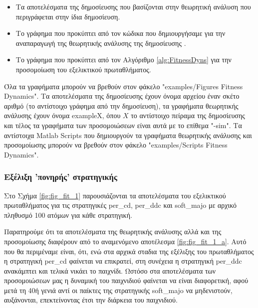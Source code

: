 \documentclass[12pt]{report}
\begin{document}
\begin{itemize}
    \item Τα αποτελέσματα της δημοσίευσης \cite{mathieu1999} που βασίζονται στην θεωρητική ανάλυση που περιγράφεται στην ίδια δημοσίευση.
    \item Το γράφημα που προκύπτει από τον κώδικα που δημιουργήσαμε για την αναπαραγωγή της θεωρητικής ανάλυσης της δημοσίευσης \cite{mathieu1999}.
    \item Το γράφημα που προκύπτει από τον Αλγόριθμο \ref{alg:FitnessDyns} για την προσομοίωση του εξελικτικού πρωταθλήματος.
\end{itemize}
Όλα τα γραφήματα μπορούν να βρεθούν στον φάκελο \foreignlanguage{english}{"examples/Figures Fitness Dynamics"}. Τα αποτελέσματα της δημοσίευσης έχουν όνομα αρχείου έναν σκέτο αριθμό (το αντίστοιχο γράφημα από την δημοσίευση), τα γραφήματα θεωρητικής ανάλυσης έχουν όνομα \foreignlanguage{english}{exampleX}, όπου $X$ το αντίστοιχο πείραμα της δημοσίευσης και τέλος τα γραφήματα των προσομοιώσεων είναι αυτά με το επίθεμα \foreignlanguage{english}{"-sim"}.
Τα αντίστοιχα \foreignlanguage{english}{Matlab Scripts} που δημιουργούν τα γραφήματα θεωρητικής ανάλυσης και προσομοίωσης μπορούν να βρεθούν στον φάκελο \foreignlanguage{english}{"examples/Scripts Fitness Dynamics"}.

\subsubsection{Εξέλιξη 'πονηρής' στρατηγικής}
Στο Σχήμα \ref{fig:fig_fit_1} παρουσιάζονται τα αποτελέσματα του εξελικτικού πρωταθλήματος για τις στρατηγικές \foreignlanguage{english}{per\_cd, per\_ddc} και \foreignlanguage{english}{soft\_majo} με αρχικό πληθυσμό 100 ατόμων για κάθε στρατηγική.

Παρατηρούμε ότι τα αποτελέσματα της θεωρητικής ανάλυσης αλλά και της προσομοίωσης διαφέρουν από το αναμενόμενο αποτέλεσμα \ref{fig:fig_fit_1_a}. Αυτό που θα περιμέναμε είναι, ότι, ενώ στα αρχικά σταδια της εξέλιξης του πρωταθλήματος η στρατηγική \foreignlanguage{english}{per\_cd} φαίνεται να επικρατεί, στη συνέχεια η στρατηγική \foreignlanguage{english}{per\_ddc} ανακάμπτει και τελικά νικάει το παιχνίδι. Ωστόσο στα αποτελέσματα των προσομοιώσεων μας η δυναμική του παιχνιδιού φαίνεται να είναι διαφορετική, αφού μετά τη 40ή γενιά αντί οι παίκτες της στρατηγικής \foreignlanguage{english}{soft\_majo} να μηδενιστούν, αυξάνονται, επεκτείνοντας έτσι την διάρκεια του παιχνιδιού.
\end{document}

